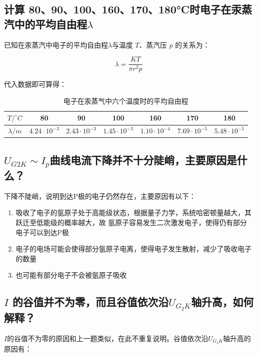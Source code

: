 \documentclass[a4paper,UTF8]{ctexart}
\begin{document}
\subsection{计算 80、90、100、160、170、180°C时电子在汞蒸汽中的平均自由程$\lambda$}

已知在汞蒸汽中电子的平均自由程$\lambda$与温度 $T$、蒸汽压 $p$ 的关系为：

\begin{equation}
    \lambda  = \frac{KT}{\pi r^2 p}
\end{equation}

代入数据即可算得：

\begin{table}[!htp]
    \centering
    \begin{tabular}{|c|c|c|c|c|c|c|}
    \hline
        $T/ ^\circ C$ & 80 & 90 & 100 & 160 & 170 & 180  \\ \hline 
        $\lambda / m$ & $4.24 \cdot 10^{-3}$ & $2.43 \cdot 10^{-3}$ & $1.45 \cdot 10^{-3}$ & $1.10 \cdot 10^{-4}$ & $7.69 \cdot 10^{-5}$ & $5.48\cdot 10^{-5}$   \\ \hline
    \end{tabular}
    \caption{电子在汞蒸气中六个温度时的平均自由程}
\end{table}

\subsection{$U_{G2K} \sim I_{p}$曲线电流下降并不十分陡峭，主要原因是什么？}

下降不陡峭，说明到达P极的电子仍然存在，主要原因有以下：

\begin{enumerate}
    \item 吸收了电子的氩原子处于高能级状态，根据量子力学，系统哈密顿量越大，其跃迁至低能级的概率越大，故
    氩原子容易发生二次激发电子，使得仍有部分电子可以到达P极
    \item 电子的电场可能会使得部分氩原子电离，使得电子发生散射，减少了吸收电子的数量
    \item 也可能有部分电子不会被氩原子吸收
\end{enumerate}

\subsection{$I$ 的谷值并不为零，而且谷值依次沿$U_{G_{2}K}$轴升高，如何解释？}

$I$的谷值不为零的原因和上一题类似，在此不重复说明。谷值依次沿$U_{G_{2}K}$轴升高的原因有：
\end{document}
